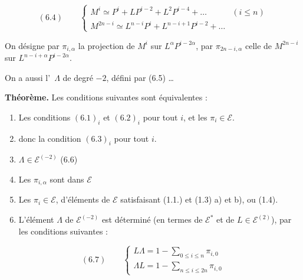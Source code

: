 \documentclass[11pt,a4paper]{article}
\begin{document}
\[ (6.4) \qquad \begin{cases} M^{i} \simeq P^{i} + L P^{i-2} + L^{2} P^{i-4} + \ldots & (i \leqslant n) \\[2pt] M^{2n-i} \simeq L^{n-i} P^{i} + L^{n-i+1} P^{i-2} + \ldots \end{cases} \]

On désigne par $\pi_{i,\alpha}$ la projection de $M^{i}$ sur
$L^{\alpha} P^{i-2\alpha}$, par $\pi_{2n-i,\alpha}$ celle de $M^{2n-i}$ sur
$L^{n-i+\alpha} P^{i-2\alpha}$.


On a aussi l'\ $\Lambda$ de degré $-2$, défini par
(6.5) \ldots

\textbf{Théorème.} Les conditions suivantes sont équivalentes  :

\begin{enumerate}
  \item Les conditions $(6.1)_{i}$ et $(6.2)_{i}$ pour tout $i$, et les $\pi_{i} \in \mathcal{E}$.
  \item \struck{\ill{}} donc la condition $(6.3)_{i}$ pour tout $i$.
  \item \struck{\ill{}} 
        $\Lambda \in \mathcal{E}^{(-2)}$ \quad (6.6)
  \item Les $\pi_{i,\alpha}$ sont dans $\mathcal{E}$ \ill{}
  \item Les $\pi_{i} \in \mathcal{E}$,   d'éléments de
        $\mathcal{E}$ satisfaisant (1.1.) et (1.3) a) et b), ou \ill{} (1.4).
  \item L'élément $\Lambda$ de $\mathcal{E}^{(-2)}$ est  déterminé
        \struck{\ill{}} (en termes de  $\mathcal{E}^{*}$ et de $L \in \mathcal{E}^{(2)}$),
        par les conditions suivantes :
\end{enumerate}


\[ (6.7) \qquad \begin{cases} L \Lambda = 1 - \sum_{0 \leqslant i \leqslant n} \pi_{i,0} \\[2pt] \Lambda L = 1 - \sum_{n \leqslant i \leqslant 2n} \pi_{i,0} \end{cases} \]
\end{document}
